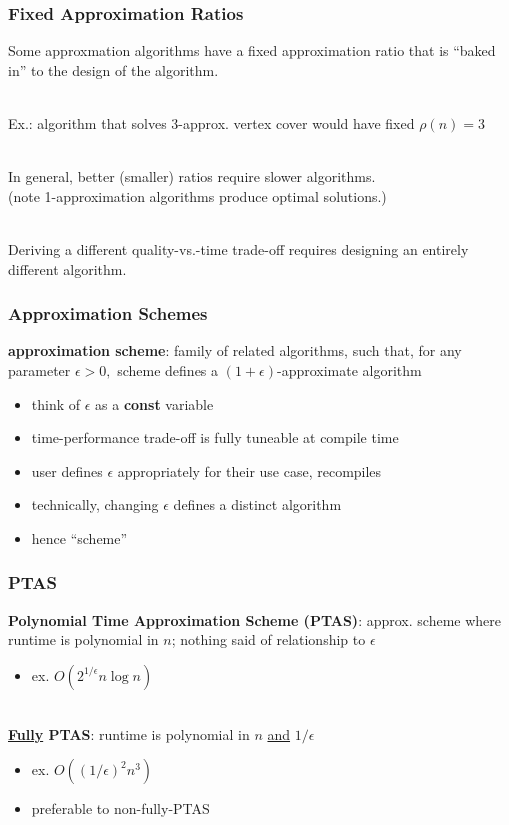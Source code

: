 \documentclass{beamer}
\newcommand{\stanza}{ \\~\ }
\begin{document}
\begin{frame} \frametitle{Fixed Approximation Ratios}
Some approxmation algorithms have a fixed approximation ratio that is
``baked in'' to the design of the algorithm. \stanza

Ex.: algorithm that solves 3-approx. vertex cover would have fixed $\rho(n)=3$
\stanza

In general, better (smaller) ratios require slower algorithms. \\
(note 1-approximation algorithms produce optimal solutions.) \stanza

Deriving a different quality-vs.-time trade-off requires designing an
entirely different algorithm.
\end{frame}

\begin{frame} \frametitle{Approximation Schemes}
\textbf{approximation scheme}: family of related algorithms, such that, for
any parameter $\epsilon > 0,$ scheme defines a
$(1+\epsilon)$-approximate algorithm
\begin{itemize}
  \item think of $\epsilon$ as a \textbf{const} variable
  \item time-performance trade-off is fully tuneable at compile time
  \item user defines $\epsilon$ appropriately for their use case, recompiles
  \item technically, changing $\epsilon$ defines a distinct algorithm
  \item hence ``scheme''
\end{itemize}
\end{frame}

\begin{frame} \frametitle{PTAS}
\textbf{Polynomial Time Approximation Scheme (PTAS)}: approx. scheme where runtime
is polynomial in $n$; nothing said of relationship to $\epsilon$ \\
\begin{itemize}
  \item ex. $O(2^{1/\epsilon} n \log n)$ \stanza
\end{itemize}

\textbf{\underline{Fully} PTAS}: runtime is polynomial in $n$ \underline{and} $1/\epsilon$ \\
\begin{itemize}
  \item ex. $O((1/\epsilon)^2 n^3)$
  \item preferable to non-fully-PTAS
\end{itemize}
\end{frame}
\end{document}
